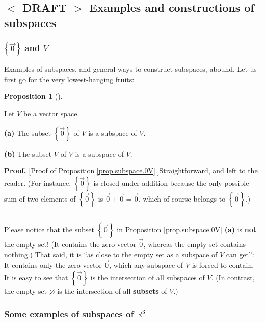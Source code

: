 \documentclass[numbers=enddot,12pt,final,onecolumn,notitlepage]{scrartcl}%
\theoremstyle{definition}
\newtheorem{prop}[theo]{Proposition}
\newenvironment{proposition}[1][]
{\begin{prop}[#1]\begin{leftbar}}
{\end{leftbar}\end{prop}}
\newenvironment{proof}[1][Proof]{\noindent\textbf{#1.} }{\ \rule{0.5em}{0.5em}}
\begin{document}
\subsection{%
$<$%
DRAFT%
$>$
Examples and constructions of subspaces}

\subsubsection{$\left\{  \protect\overrightarrow{0}\right\}  $ and $V$}

Examples of subspaces, and general ways to construct subspaces, abound. Let us
first go for the very lowest-hanging fruits:

\begin{proposition}
\label{prop.subspace.0V}Let $V$ be a vector space.

\textbf{(a)} The subset $\left\{  \overrightarrow{0}\right\}  $ of $V$ is a
subspace of $V$.

\textbf{(b)} The subset $V$ of $V$ is a subspace of $V$.
\end{proposition}

\begin{proof}
[Proof of Proposition \ref{prop.subspace.0V}.]Straightforward, and left to the
reader. (For instance, $\left\{  \overrightarrow{0}\right\}  $ is closed under
addition because the only possible sum of two elements of $\left\{
\overrightarrow{0}\right\}  $ is $\overrightarrow{0}+\overrightarrow{0}%
=\overrightarrow{0}$, which of course belongs to $\left\{  \overrightarrow{0}%
\right\}  $.)
\end{proof}

Please notice that the subset $\left\{  \overrightarrow{0}\right\}  $ in
Proposition \ref{prop.subspace.0V} \textbf{(a)} is \textbf{not} the empty set!
(It contains the zero vector $\overrightarrow{0}$, whereas the empty set
contains nothing.) That said, it is \textquotedblleft as close to the empty
set as a subspace of $V$ can get\textquotedblright: It contains only the zero
vector $\overrightarrow{0}$, which any subspace of $V$ is forced to contain.
It is easy to see that $\left\{  \overrightarrow{0}\right\}  $ is the
intersection of all subspaces of $V$. (In contrast, the empty set
$\varnothing$ is the intersection of all \textbf{subsets} of $V$.)

\subsubsection{Some examples of subspaces of $\mathbb{R}^{3}$}
\end{document}
